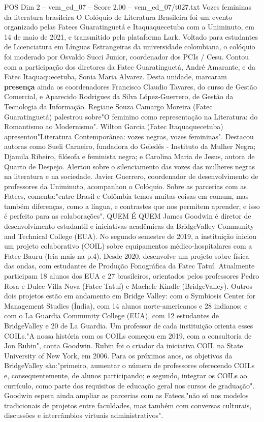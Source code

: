 \begin{textsample}{POS Dim 2 – vem\_ed\_07 – Score 2.00 – vem\_ed\_07/t027.txt}  \label{ex:f2_pos_161}
Vozes femininas da literatura brasileira O Colóquio de Literatura Brasileira foi um evento organizado pelas Fatecs Guaratinguetá e Itaquaquecetuba com a Uniminuto, em 14 de maio de 2021, e transmitido pela plataforma Lark.
Voltado para estudantes de Licenciatura em Línguas Estrangeiras da universidade colombiana, o colóquio foi moderado por Osvaldo Succi Junior, coordenador dos PCIs / Cesu.
Contou com a participação dos diretores da Fatec Guaratinguetá, André Amarante, e da Fatec Itaquaquecetuba, Sonia Maria Alvarez.
Desta unidade, marcaram \textbf{presença} ainda os coordenadores Francisco Claudio Tavares, do curso de Gestão Comercial, e Aparecido Rodrigues da Silva López-Guerrero, de Gestão da Tecnologia da Informação.
Regiane Souza Camargo Moreira (Fatec Guaratinguetá) palestrou sobre"O feminino como representação na Literatura: do Romantismo ao Modernismo".
Wilton Garcia (Fatec Itaquaquecetuba) apresentou"Literatura Contemporânea: vozes negras, vozes femininas".
Destacou autoras como Sueli Carneiro, fundadora do Geledés - Instituto da Mulher Negra; Djamila Ribeiro, filósofa e feminista negra; e Carolina Maria de Jesus, autora de Quarto de Despejo.
Alertou sobre o silenciamento das vozes das mulheres negras na literatura e na sociedade.
Javier Guerrero, coordenador de desenvolvimento de professores da Uniminuto, acompanhou o Colóquio.
Sobre as parcerias com as Fatecs, comenta:"entre Brasil e Colômbia temos muitas coisas em comum, mas também diferenças, como a língua, e contrastes que nos permitem aprender, e isso é perfeito para as colaborações".
QUEM É QUEM James Goodwin é diretor de desenvolvimento estudantil e iniciativas acadêmicas da BridgeValley Community and Technical College (EUA).
No segundo semestre de 2019, a instituição iniciou um projeto colaborativo (COIL) sobre equipamentos médico-hospitalares com a Fatec Bauru (leia mais na p.4).
Desde 2020, desenvolve um projeto sobre física das ondas, com estudantes de Produção Fonográfica da Fatec Tatuí.
Atualmente participam 18 alunos dos EUA e 27 brasileiros, orientados pelos professores Pedro Rosa e Dulce Villa Nova (Fatec Tatuí) e Machele Kindle (BridgeValley).
Outros dois projetos estão em andamento em Bridge Valley: com o Symbiosis Center for Management Studies (Índia), com 14 alunos norte-americanos e 28 indianos; e com o La Guardia Community College (EUA), com 12 estudantes de BridgeValley e 20 de La Guardia.
Um professor de cada instituição orienta esses COILs."A nossa história com os COILs começou em 2019, com a consultoria de Jon Rubin", conta Goodwin.
Rubin foi o criador da iniciativa COIL na State University of New York, em 2006.
Para os próximos anos, os objetivos da BridgeValley são:"primeiro, aumentar o número de professores oferecendo COILs e, consequentemente, de alunos participando; e segundo, integrar os COILs ao currículo, como parte dos requisitos de educação geral nos cursos de graduação".
Goodwin espera ainda ampliar as parcerias com as Fatecs,"não só nos modelos tradicionais de projetos entre faculdades, mas também com conversas culturais, discussões e intercâmbios virtuais administrativos".

\end{textsample}
